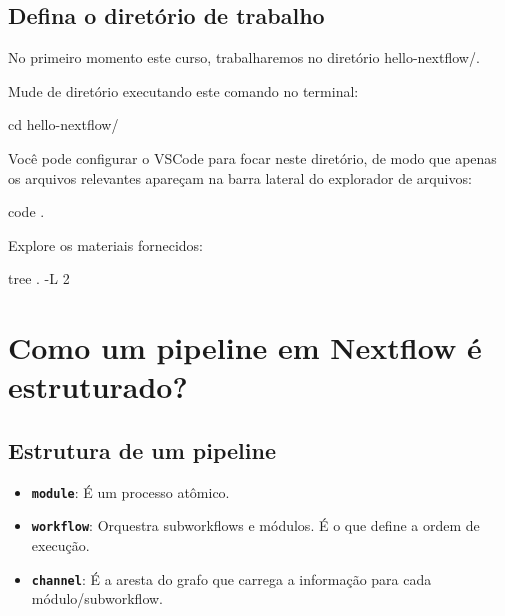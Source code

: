 \documentclass[
  brazilian,
  letterpaper,
  DIV=11,
  numbers=noendperiod]{scrreprt}
\newenvironment{Shaded}{\begin{snugshade}}{\end{snugshade}}
\newcommand{\AttributeTok}[1]{\textcolor[rgb]{0.40,0.45,0.13}{#1}}
\newcommand{\BuiltInTok}[1]{\textcolor[rgb]{0.00,0.23,0.31}{#1}}
\newcommand{\ExtensionTok}[1]{\textcolor[rgb]{0.00,0.23,0.31}{#1}}
\newcommand{\NormalTok}[1]{\textcolor[rgb]{0.00,0.23,0.31}{#1}}
\providecommand{\tightlist}{%
  \setlength{\itemsep}{0pt}\setlength{\parskip}{0pt}}
\begin{document}
\section{Defina o diretório de
trabalho}\label{defina-o-diretuxf3rio-de-trabalho}

No primeiro momento este curso, trabalharemos no diretório
hello-nextflow/.

Mude de diretório executando este comando no terminal:

\begin{Shaded}
\begin{Highlighting}[]
\BuiltInTok{cd}\NormalTok{ hello{-}nextflow/}
\end{Highlighting}
\end{Shaded}

Você pode configurar o VSCode para focar neste diretório, de modo que
apenas os arquivos relevantes apareçam na barra lateral do explorador de
arquivos:

\begin{Shaded}
\begin{Highlighting}[]
\ExtensionTok{code}\NormalTok{ .}
\end{Highlighting}
\end{Shaded}

Explore os materiais fornecidos:

\begin{Shaded}
\begin{Highlighting}[]
\ExtensionTok{tree}\NormalTok{ . }\AttributeTok{{-}L}\NormalTok{ 2}
\end{Highlighting}
\end{Shaded}

\chapter{Como um pipeline em Nextflow é
estruturado?}\label{como-um-pipeline-em-nextflow-uxe9-estruturado}

\section{Estrutura de um pipeline}\label{estrutura-de-um-pipeline}

\begin{itemize}
\tightlist
\item
  \textbf{\texttt{module}}: É um processo atômico.
\item
  \textbf{\texttt{workflow}}: Orquestra subworkflows e módulos. É o que
  define a ordem de execução.
\item
  \textbf{\texttt{channel}}: É a aresta do grafo que carrega a
  informação para cada módulo/subworkflow.
\end{itemize}
\end{document}

